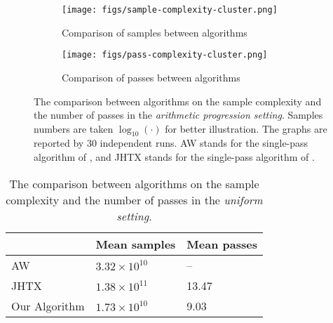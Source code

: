 \begin{figure}
	\centering
	\begin{subfigure}{0.5\textwidth}
		\centering
		\texttt{[image: figs/sample-complexity-cluster.png]}
		\caption{Comparison of samples between algorithms}
		\label{fig:cluster-exp-sample}
	\end{subfigure}%
	\begin{subfigure}{0.5\textwidth}
		\centering
		\texttt{[image: figs/pass-complexity-cluster.png]}
		\caption{Comparison of passes between algorithms}
		\label{fig:cluster-exp-pass}
	\end{subfigure}
	\caption{The comparison between algorithms on the sample complexity and the number of passes in the \emph{arithmetic progression setting}. Samples numbers are taken $\log_{10}(\cdot)$ for better illustration. The graphs are reported by $30$ independent runs. AW stands for the single-pass algorithm of \cite{AssadiW20}, and JHTX stands for the single-pass algorithm of \cite{JinH0X21}.}
	\label{fig:experiments-cluster}
\end{figure}

\begin{table}[!h]
	\centering
	\captionsetup{justification=centering}
	\caption{\label{tab:exp-cluster} The comparison between algorithms on the sample complexity and the number of passes in the \emph{uniform setting}.}
	\begin{tabular}{|l|l|l|}
		\hline
		& Mean samples & Mean passes \\ \hline
		AW & $3.32\times 10^{10}$ & -- \\ \hline
		JHTX & $1.38\times 10^{11}$ & 13.47 \\ \hline
		Our Algorithm & $1.73\times 10^{10}$ & 9.03  \\ \hline
	\end{tabular}
\end{table}


